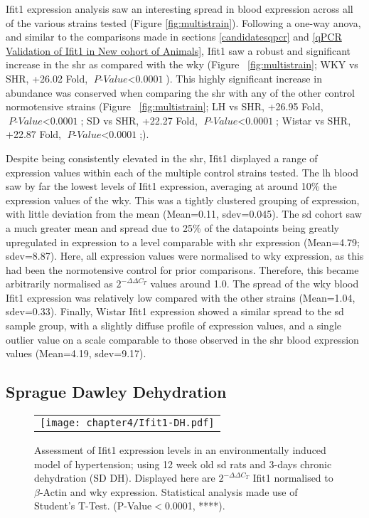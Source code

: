Ifit1 expression analysis saw an interesting spread in blood expression across all of the various strains tested (Figure \ref{fig:multistrain}). Following a one-way \acrshort{anova}, and similar to the comparisons made in sections \ref{candidatesqpcr} and \ref{qPCR Validation of Ifit1 in New cohort of Animals}, Ifit1 saw a robust and significant increase in the \acrshort{shr} as compared with the \acrshort{wky} (Figure ~\ref{fig:multistrain}; WKY vs SHR, +26.02 Fold, $\textit{P-Value$<$0.0001}$). This highly significant increase in abundance was conserved when comparing the \acrshort{shr} with any of the other control normotensive strains (Figure ~\ref{fig:multistrain}; LH vs SHR, +26.95 Fold, $\textit{P-Value$<$0.0001}$; SD vs SHR, +22.27 Fold, $\textit{P-Value$<$0.0001}$; Wistar vs SHR, +22.87 Fold, $\textit{P-Value$<$0.0001}$;).

Despite being consistently elevated in the \acrshort{shr}, Ifit1 displayed a range of expression values within each of the multiple control strains tested. The \acrshort{lh} blood saw by far the lowest levels of Ifit1 expression, averaging at around 10\% the expression values of the \acrshort{wky}. This was a tightly clustered grouping of expression, with little deviation from the mean (Mean=0.11, \acrshort{sdev}=0.045). The \acrshort{sd} cohort saw a much greater mean and spread due to 25\% of the datapoints being greatly upregulated in expression to a level comparable with \acrshort{shr} expression (Mean=4.79; \acrshort{sdev}=8.87). Here, all expression values were normalised to \acrshort{wky} expression, as this had been the normotensive control for prior comparisons. Therefore, this became arbitrarily normalised as $2^{-\Delta\Delta C_{T}}$ values around 1.0. The spread of the \acrshort{wky} blood Ifit1 expression was relatively low compared with the other strains (Mean=1.04, \acrshort{sdev}=0.33). Finally, Wistar Ifit1 expression showed a similar spread to the \acrshort{sd} sample group, with a slightly diffuse profile of expression values, and a single outlier value on a scale comparable to those observed in the \acrshort{shr} blood expression values (Mean=4.19, \acrshort{sdev}=9.17).

\subsection{Sprague Dawley Dehydration}

\begin{figure*}
\centering
\begin{tabular}{c}
  \texttt{[image: chapter4/Ifit1-DH.pdf]} \\
\end{tabular}
\caption[Environmentally induced hypertension in SD rats by dehydration]{Assessment of Ifit1 expression levels in an environmentally induced model of hypertension; using 12 week old \acrfull{sd} rats and 3-days chronic dehydration (SD DH). Displayed here are $2^{-\Delta\Delta C_{T}}$ Ifit1 normalised to $\beta$-Actin and \acrshort{wky} expression. Statistical analysis made use of Student's T-Test. (P-Value$<$0.0001, ****).}
\label{fig:dehydration}
\end{figure*}

